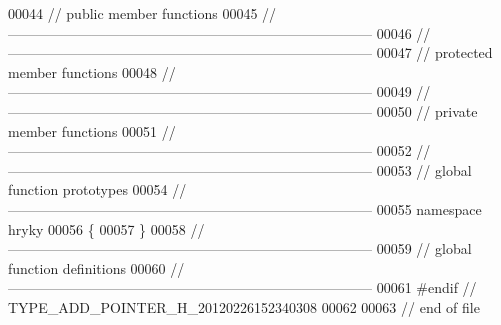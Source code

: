 \begin{DoxyCode}
00044 \textcolor{comment}{// public member functions}
00045 \textcolor{comment}{//
      ------------------------------------------------------------------------------}
00046 \textcolor{comment}{//
      ------------------------------------------------------------------------------}
00047 \textcolor{comment}{// protected member functions}
00048 \textcolor{comment}{//
      ------------------------------------------------------------------------------}
00049 \textcolor{comment}{//
      ------------------------------------------------------------------------------}
00050 \textcolor{comment}{// private member functions}
00051 \textcolor{comment}{//
      ------------------------------------------------------------------------------}
00052 \textcolor{comment}{//
      ------------------------------------------------------------------------------}
00053 \textcolor{comment}{// global function prototypes}
00054 \textcolor{comment}{//
      ------------------------------------------------------------------------------}
00055 \textcolor{keyword}{namespace }hryky
00056 \{
00057 \}
00058 \textcolor{comment}{//
      ------------------------------------------------------------------------------}
00059 \textcolor{comment}{// global function definitions}
00060 \textcolor{comment}{//
      ------------------------------------------------------------------------------}
00061 \textcolor{preprocessor}{#endif // TYPE\_ADD\_POINTER\_H\_20120226152340308}
00062 \textcolor{preprocessor}{}
00063 \textcolor{comment}{// end of file}
\end{DoxyCode}
